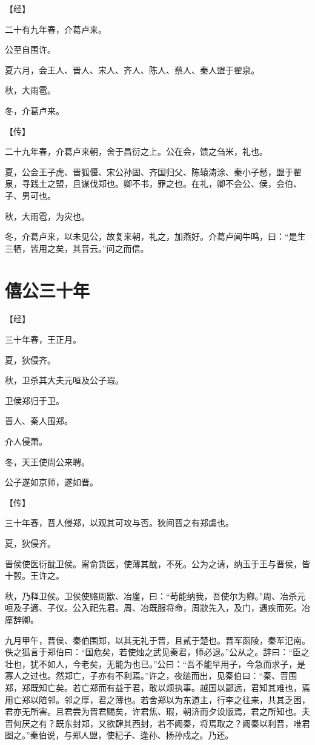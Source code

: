 \documentclass[a4paper,12pt,UTF8,twoside]{ctexbook}
\begin{document}
【经】

二十有九年春，介葛卢来。

公至自围许。

夏六月，会王人、晋人、宋人、齐人、陈人、蔡人、秦人盟于翟泉。

秋，大雨雹。

冬，介葛卢来。

【传】

二十九年春，介葛卢来朝，舍于昌衍之上。公在会，馈之刍米，礼也。

夏，公会王子虎、晋狐偃、宋公孙固、齐国归父、陈辕涛涂、秦小子慭，盟于翟泉，寻践土之盟，且谋伐郑也。卿不书，罪之也。在礼，卿不会公、侯，会伯、子、男可也。

秋，大雨雹，为灾也。

冬，介葛卢来，以未见公，故复来朝，礼之，加燕好。介葛卢闻牛鸣，曰：“是生三牺，皆用之矣，其音云。”问之而信。


\chapter{僖公三十年}



【经】

三十年春，王正月。

夏，狄侵齐。

秋，卫杀其大夫元咺及公子瑕。

卫侯郑归于卫。

晋人、秦人围郑。

介人侵萧。

冬，天王使周公来聘。

公子遂如京师，遂如晋。

【传】

三十年春，晋人侵郑，以观其可攻与否。狄间晋之有郑虞也。



夏，狄侵齐。

晋侯使医衍酖卫侯。甯俞货医，使薄其酖，不死。公为之请，纳玉于王与晋侯，皆十瑴。王许之。

秋，乃释卫侯。卫侯使赂周歂、冶廑，曰：“苟能纳我，吾使尔为卿。”周、冶杀元咺及子適、子仪。公入祀先君。周、冶既服将命，周歂先入，及门，遇疾而死。冶廑辞卿。

九月甲午，晋侯、秦伯围郑，以其无礼于晋，且贰于楚也。晋军函陵，秦军氾南。佚之狐言于郑伯曰：“国危矣，若使烛之武见秦君，师必退。”公从之。辞曰：“臣之壮也，犹不如人，今老矣，无能为也已。”公曰：“吾不能早用子，今急而求子，是寡人之过也。然郑亡，子亦有不利焉。”许之，夜缒而出，见秦伯曰：“秦、晋围郑，郑既知亡矣。若亡郑而有益于君，敢以烦执事。越国以鄙远，君知其难也，焉用亡郑以陪邻。邻之厚，君之薄也。若舍郑以为东道主，行李之往来，共其乏困，君亦无所害。且君尝为晋君赐矣，许君焦、瑕，朝济而夕设版焉，君之所知也。夫晋何厌之有？既东封郑，又欲肆其西封，若不阙秦，将焉取之？阙秦以利晋，唯君图之。”秦伯说，与郑人盟，使杞子、逢孙、扬孙戍之。乃还。
\end{document}
